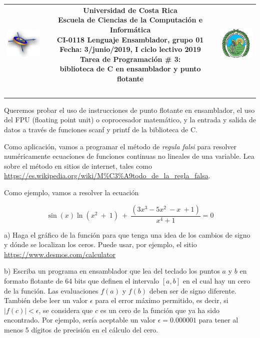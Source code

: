 \documentclass[12pt,letterpaper]{article}
\begin{document}
\begin{tabular}{ccc}
  \includegraphics[width=20mm]{ECCI.jpg}
  \hfill
  & 
  \parbox{5.2in}{ \centering 
                \textbf{Universidad de Costa Rica\\
                Escuela de Ciencias de la Computación e Informática\\
                CI-0118 Lenguaje Ensamblador, grupo 01\\
                Fecha: 3/junio/2019, I ciclo lectivo 2019\\
                \Large Tarea de Programación \# 3:\\
                biblioteca de C en ensamblador y punto flotante}\\
                \hrulefill
                }  
  & 
  \includegraphics[width=20mm]{UCR.jpg}\\ ~\\
 \end{tabular}

 Queremos probar el uso de instrucciones de punto flotante en ensamblador, el uso del FPU (floating point unit) o coprocesador matemático, y la entrada y salida de datos a través de funciones scanf y printf de la biblioteca de C.
 
 Como aplicación, vamos a programar el método de \emph{regula falsi} para resolver numéricamente ecuaciones de funciones continuas no lineales de una variable. Lea sobre el método en sitios de internet, tales como \url{https://es.wikipedia.org/wiki/M%C3%A9todo_de_la_regla_falsa}.
 
 Como ejemplo, vamos a resolver la ecuación 
 
 \[\sin\left(x\right)\ln\left(x^2\ +\ 1\right)\ +\ \frac{\left(3x^3-5x^2\ -x\ +1\right)}{x^4+1} = 0\]
 
 a) Haga el gráfico de la función para que tenga una idea de los cambios de signo y dónde se localizan los ceros. Puede usar, por ejemplo, el sitio \url{https://www.desmos.com/calculator}
 
 b) Escriba un programa en ensamblador que lea del teclado los puntos $a$ y $b$ en formato flotante de 64 bits que definen el intervalo $[a, b]$ en el cual hay un cero de la función. Las evaluaciones $f(a)$ y $f(b)$ deben ser de signo diferente. También debe leer un valor $\epsilon$ para el error máximo permitido, es decir, si $|f(c)| < \epsilon$, se considera que $c$ es un cero de la función que ya ha sido encontrado. Por ejemplo, sería aceptable un valor $\epsilon = 0.000001$ para tener al menos 5 dígitos de precisión en el cálculo del cero.
 
\end{document}
